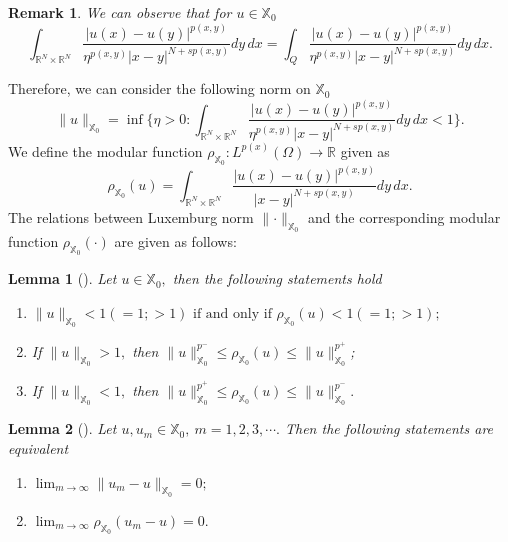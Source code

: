 \documentclass[11pt]{article}
\newtheorem{lemma}{Lemma}[section] %
\newtheorem{remark}{Remark}[section]
\newcommand{\Q}{\textit{Q}}
\newcommand{\ra} {\rightarrow}
\newcommand{\real}{\mathbb{R}}
\newcommand{\rnn}{\mathbb{R}^{N}}
\newcommand{\lv}{\lVert}
\newcommand{\rv}{\rVert}
\begin{document}
\begin{remark}\rm
    We can observe that for
$u\in\mathbb{X}_0$
    \begin{equation*}
\int_{\rnn\times\rnn} 
\frac{|u(x) - u(y)|^{p(x,y)}}{\eta^{p(x,y)} 
|x-y|^{N + s p(x,y)}} dy \, dx=
\int_{\Q} 
\frac{|u(x) - u(y)|^{p(x,y)}}{\eta^{p(x,y)} 
|x-y|^{N + s p(x,y)}} dy \, dx.
\end{equation*}
\end{remark}


Therefore, we can consider the following norm on
$\mathbb{X}_0$
\begin{equation*}
    \|u\|_{\mathbb{X}_0} = \inf
    \Big \{ \eta > 0 : 
\int_{\rnn\times\rnn} 
\frac{|u(x) - u(y)|^{p(x,y)}}{\eta^{p(x,y)} 
|x-y|^{N + s p(x,y)}} dy \, dx < 1 
\Big \}.
\end{equation*}
We define the modular function
$\rho_{\mathbb{X}_0}:L^{p(x)}(\Omega)\ra \real$
given as
$$\rho_{\mathbb{X}_0}(u) = 
\int_{\rnn\times\rnn} 
\frac{|u(x) - u(y)|^{p(x,y)}}
{|x-y|^{N + s p(x,y)}} dy \, dx.$$
The relations between Luxemburg norm
$\lv \cdot \rv_{\mathbb{X}_0}$
and 
the corresponding modular function
$\rho_{\mathbb{X}_0}(\cdot)$
are given as follows:


\begin{lemma}[\cite{KyHo}]
	Let
$u \in \mathbb{X}_0,$
then the following statements hold
	\begin{enumerate}
		
\item[(i)]$
\lv u \rv_{\mathbb{X}_0}<1(=1;>1) 
\text{ if and only if } 
\rho_{\mathbb{X}_0}(u)<1(=1;>1);$

\item[(ii)] If $\lv u \rv_{\mathbb{X}_0}>1,$
then $\lv u \rv_{\mathbb{X}_0} ^{p^{-}}
\leq\rho_{\mathbb{X}_0}(u)\leq\lv u
 \rv_{\mathbb{X}_0}^{p^{+}}$;
		
\item[(iii)] 
		If 
 $\lv u \rv_{\mathbb{X}_0}<1,$
then 
$\lv u \rv_{\mathbb{X}_0}^{p^{+}}
\leq
\rho_{\mathbb{X}_0}(u)\leq\lv u 
\rv_{\mathbb{X}_0}^{p^{-}}.$
	\end{enumerate}
\end{lemma}

\begin{lemma}[\cite{KyHo}]
	Let 
$u,u_{m}  \in \mathbb{X}_0,~m=1,2,3,\cdots .$
Then the following statements are equivalent
	\begin{enumerate}
	
\item[(i)] $\displaystyle{\lim_{m\ra \infty} }
\lv u_{m} - u \rv_{\mathbb{X}_0} =0;$

\item[(ii)] $\displaystyle{\lim_{m\ra \infty}} 
\rho_{\mathbb{X}_0}(u_{m} -u)=0.$
	\end{enumerate}
\end{lemma}
\end{document}
